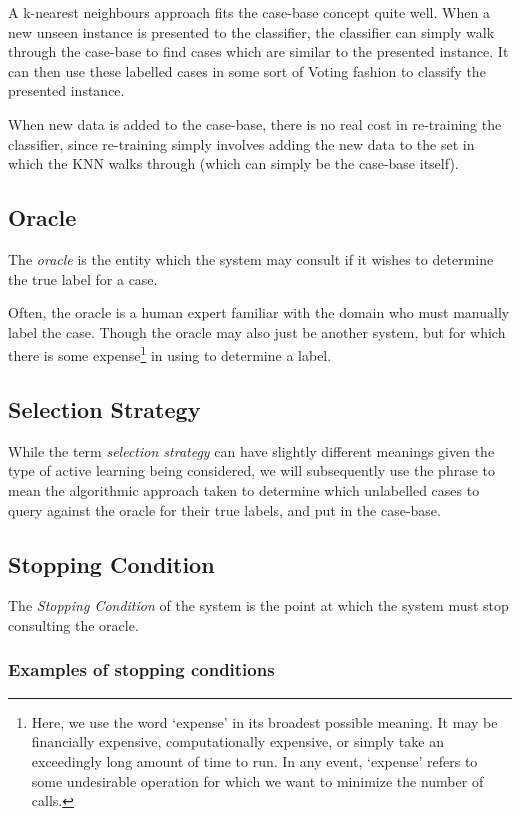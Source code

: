 \documentclass[a4paper,11pt]{report}
\begin{document}
A k-nearest neighbours approach fits the case-base concept quite well. When a new unseen instance is presented to the classifier, the classifier can simply walk through the case-base to find cases which are similar to the presented instance. It can then use these labelled cases in some sort of Voting fashion to classify the presented instance.

When new data is added to the case-base, there is no real cost in re-training the classifier, since re-training simply involves adding the new data to the set in which the KNN walks through (which can simply be the case-base itself).

\subsection{Oracle}
The \emph{oracle} is the entity which the system may consult if it wishes to determine the true label for a case.

Often, the oracle is a human expert familiar with the domain who must manually label the case. Though the oracle may also just be another system, but for which there is some expense\footnote{Here, we use the word `expense' in its broadest possible meaning. It may be financially expensive, computationally expensive, or simply take an exceedingly long amount of time to run. In any event, `expense' refers to some undesirable operation for which we want to minimize the number of calls.} in using to determine a label. 

\subsection{Selection Strategy}
While the term \emph{selection strategy} can have slightly different meanings given the type of active learning being considered, we will subsequently use the phrase to mean the algorithmic approach taken to determine which unlabelled cases to query against the oracle for their true labels, and put in the case-base.

\subsection{Stopping Condition}
The \emph{Stopping Condition} of the system is the point at which the system must stop consulting the oracle.

\subsubsection{Examples of stopping conditions}
\end{document}

